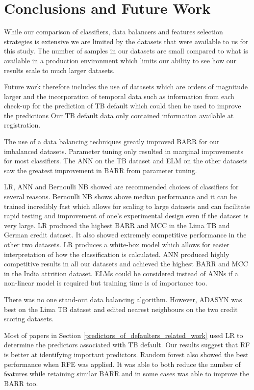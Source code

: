 \documentclass{sig-alternate-05-2015}
\begin{document}
	\section{Conclusions and Future Work}
	While our comparison of classifiers, data balancers and features selection strategies is extensive we are limited by the datasets that were available to us for this study. The number of samples in our datasets are small compared to what is available in a production environment which limits our ability to see how our results scale to much larger datasets.
	
	Future work therefore includes the use of datasets which are orders of magnitude larger and the incorporation of temporal data such as information from each check-up for the prediction of TB default which could then be used to improve the predictions Our TB default data only contained information available at registration.
	
	The use of a data balancing techniques greatly improved BARR for our imbalanced datasets. Parameter tuning only resulted in marginal improvements for most classifiers. The ANN on the TB dataset and ELM on the other datasets saw the greatest improvement in BARR from parameter tuning.
	
	LR, ANN and Bernoulli NB showed are recommended choices of classifiers for several reasons. Bernoulli NB shows above median performance and it can be trained incredibly fast which allows for scaling to large datasets and can facilitate rapid testing and improvement of one's experimental design even if the dataset is very large. LR produced the highest BARR and MCC in the Lima TB and German credit dataset. It also showed extremely competitive performance in the other two datasets. LR produces a white-box model which allows for easier interpretation of how the classification is calculated. ANN produced highly competitive results in all our datasets and achieved the highest BARR and MCC in the India attrition dataset. ELMs could be considered instead of ANNs if a non-linear model is required but training time is of importance too.
	
	There was no one stand-out data balancing algorithm. However, ADASYN was best on the Lima TB dataset and edited nearest neighbours on the two credit scoring datasets.
		
	Most of papers in Section \ref{predictors_of_defaulters_related_work} used LR to determine the predictors associated with TB default. Our results suggest that RF is better at identifying important predictors. Random forest also showed the best performance when RFE was applied. It was able to both reduce the number of features while retaining similar BARR and in some cases was able to improve the BARR too.
	
\end{document}
